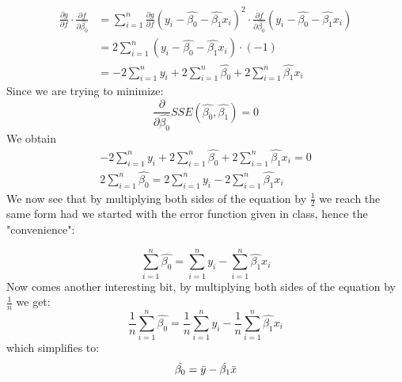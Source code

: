 \documentclass{article}
\begin{document}
\begin{align*}
\frac{\partial g}{\partial f}\cdot\frac{\partial f} {\partial \hat{\beta_0}} & = 
\sum_{i=1}^{n} \frac{\partial g}{\partial f} (y_i - \hat{\beta_{0}} - \hat{\beta_{1}}x_i)^2 \cdot \frac{\partial f} {\partial \hat{\beta_0}} (y_i - \hat{\beta_{0}} - \hat{\beta_{1}}x_i) \\
& = 2 \sum_{i=1}^{n} (y_i - \hat{\beta_{0}} - \hat{\beta_{1}}x_i) \cdot 
(-1) \\
& =  -2\sum_{i=1}^{n}y_i  + 2\sum_{i=1}^{n}\hat{\beta_{0}} + 2\sum_{i=1}^{n}\hat{\beta_{1}}x_i
\end{align*}
Since we are trying to minimize:
$$
\frac{\partial}{\partial \hat{\beta_0}}SSE(\hat{\beta_0}, \hat{\beta_1}) = 0
$$
We obtain
\begin{gather*}
 -2\sum_{i=1}^{n}y_i  + 2\sum_{i=1}^{n}\hat{\beta_{0}} + 2\sum_{i=1}^{n}\hat{\beta_{1}}x_i  = 0 \\
2 \sum_{i=1}^{n} \hat{\beta_{0}}  = 2\sum_{i=1}^{n}y_i    - 2\sum_{i=1}^{n} \hat{\beta_{1}}x_i
\end{gather*}
We now see that by multiplying both sides of the equation by $\frac{1}{2}$ we reach the same form had we started with the error function given in class, hence the "convenience":

$$
\sum_{i=1}^{n} \hat{\beta_{0}}  = \sum_{i=1}^{n}y_i   - \sum_{i=1}^{n} \hat{\beta_{1}}x_i
$$
Now comes another interesting bit, by multiplying both sides of the equation by $\frac{1}{n}$ we get:
$$
\frac{1}{n}\sum_{i=1}^{n} \hat{\beta_{0}}  =   \frac{1}{n}\sum_{i=1}^{n}y_i  - \frac{1}{n} \sum_{i=1}^{n} \hat{\beta_{1}}x_i
$$
which simplifies to:
\begin{equation}
\hat{\beta_0} =  \bar{y} - \hat{\beta_1}\bar{x} \\ \label{eq:1}
\end{equation}

\end{document}

